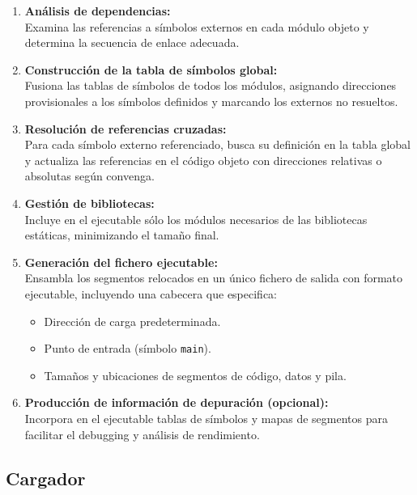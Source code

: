 \documentclass{article}
\begin{document}
\begin{enumerate}
  \item \textbf{Análisis de dependencias:}\\
        Examina las referencias a símbolos externos en cada módulo objeto y determina la secuencia de enlace adecuada.

  \item \textbf{Construcción de la tabla de símbolos global:}\\
        Fusiona las tablas de símbolos de todos los módulos, asignando direcciones provisionales a los símbolos definidos y marcando los externos no resueltos.

  \item \textbf{Resolución de referencias cruzadas:}\\
        Para cada símbolo externo referenciado, busca su definición en la tabla global y actualiza las referencias en el código objeto con direcciones relativas o absolutas según convenga.

  \item \textbf{Gestión de bibliotecas:}\\
        Incluye en el ejecutable sólo los módulos necesarios de las bibliotecas estáticas, minimizando el tamaño final.

  \item \textbf{Generación del fichero ejecutable:}\\
        Ensambla los segmentos relocados en un único fichero de salida con formato ejecutable, incluyendo una cabecera que especifica:
        \begin{itemize}
          \item Dirección de carga predeterminada.
          \item Punto de entrada (símbolo \texttt{main}).
          \item Tamaños y ubicaciones de segmentos de código, datos y pila.
        \end{itemize}

  \item \textbf{Producción de información de depuración (opcional):}\\
        Incorpora en el ejecutable tablas de símbolos y mapas de segmentos para facilitar el debugging y análisis de rendimiento.
\end{enumerate}

\subsection{Cargador}
\end{document}
